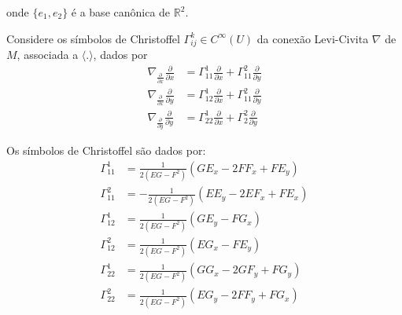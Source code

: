 onde $\{e_1,e_2\}$ é a base canônica de $\mathbb{R}^2$.

Considere os símbolos de Christoffel $\Gamma_{ij}^k \in C^{\infty}(U)$ da conexão Levi-Civita $\nabla$ de $M$, associada a $\langle.\rangle$, dados por
\begin{equation}
	\begin{split}
		\nabla_{\frac{\partial}{\partial x}} \frac{\partial}{\partial x} &= \Gamma_{11}^1 \frac{\partial}{\partial x} + \Gamma_{11}^2 \frac{\partial}{\partial y}\\\label{christoffel}
		\nabla_{\frac{\partial}{\partial x}} \frac{\partial}{\partial y} &= \Gamma_{12}^1 \frac{\partial}{\partial x} + \Gamma_{11}^2 \frac{\partial}{\partial y}\\
		\nabla_{\frac{\partial}{\partial y}} \frac{\partial}{\partial y} &= \Gamma_{22}^1 \frac{\partial}{\partial x} + \Gamma_{2}^2 \frac{\partial}{\partial y}
	\end{split}	
\end{equation}

\begin{prop}
	Os símbolos de Christoffel são dados por:
	\begin{align*}
		\Gamma_{11}^1 &= \frac{1}{2(EG-F^2)} (GE_x - 2FF_x + FE_y)\\
		\Gamma_{11}^2 &= -\frac{1}{2(EG-F^2)} (EE_y - 2EF_x + FE_x)\\
		\Gamma_{12}^1 &= \frac{1}{2(EG-F^2)} (GE_y - FG_x)\\
		\Gamma_{12}^2 &= \frac{1}{2(EG-F^2)} (EG_x - FE_y)\\
		\Gamma_{22}^1 &= \frac{1}{2(EG-F^2)} (GG_x - 2GF_y + FG_y)\\
		\Gamma_{22}^2 &= \frac{1}{2(EG-F^2)} (EG_y - 2FF_y + FG_x)
	\end{align*}
\end{prop}

